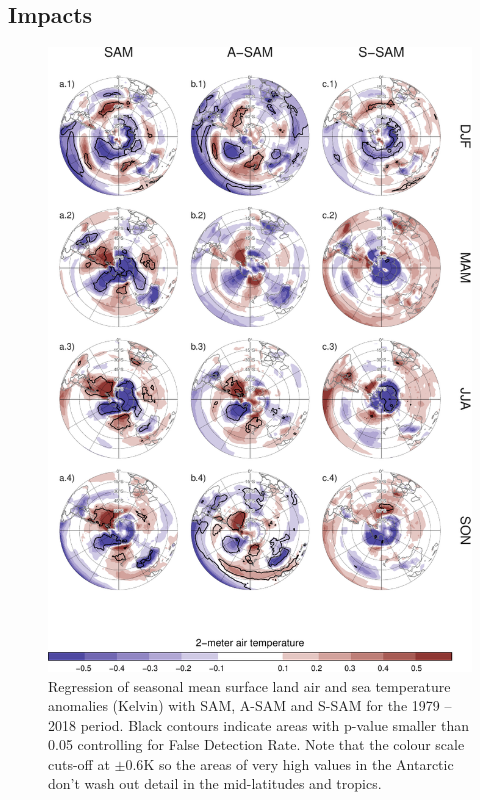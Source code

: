 \documentclass[smallextended]{svjour3}       %
\begin{document}
\hypertarget{impacts}{%
\subsection{Impacts}\label{impacts}}



\begin{figure}
\includegraphics{regr-air-season-1} \caption{Regression of seasonal mean surface land air and sea temperature anomalies (Kelvin) with SAM, A\nobreakdash-SAM and S\nobreakdash-SAM for the 1979 -- 2018 period. Black contours indicate areas with p-value smaller than 0.05 controlling for False Detection Rate. Note that the colour scale cuts-off at \(\pm0.6 \mathrm{K}\) so the areas of very high values in the Antarctic don't wash out detail in the mid-latitudes and tropics.}\label{fig:regr-air-season}
\end{figure}
\end{document}

